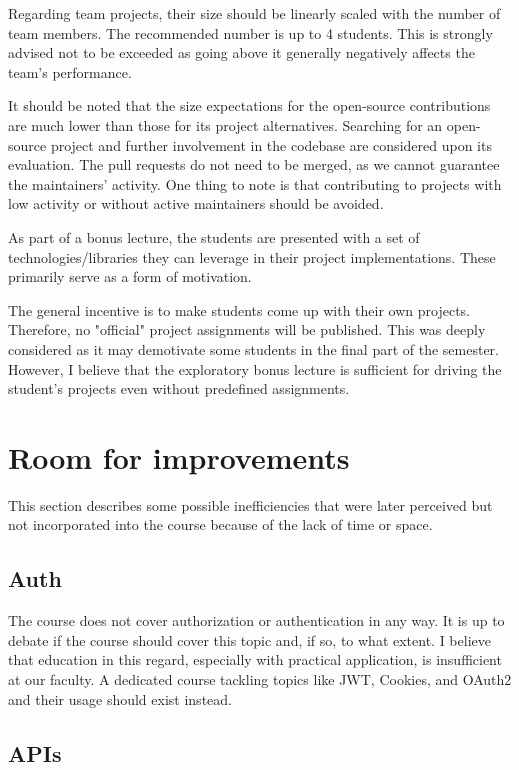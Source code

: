 \documentclass[
  digital,
  color,
  oneside,
  nosansbold,
  nocolorbold,
  lof,
  lot,
]{fithesis4}
\begin{document}
Regarding team projects, their size should be linearly scaled with the number of team members. The recommended number is up to 4 students. This is strongly advised not to be exceeded as going above it generally negatively affects the team's performance.

It should be noted that the size expectations for the open-source contributions are much lower than those for its project alternatives. Searching for an open-source project and further involvement in the codebase are considered upon its evaluation. The pull requests do not need to be merged, as we cannot guarantee the maintainers' activity. One thing to note is that contributing to projects with low activity or without active maintainers should be avoided.

As part of a bonus lecture, the students are presented with a set of technologies/libraries they can leverage in their project implementations. These primarily serve as a form of motivation.

The general incentive is to make students come up with their own projects. Therefore, no "official" project assignments will be published. This was deeply considered as it may demotivate some students in the final part of the semester. However, I believe that the exploratory bonus lecture is sufficient for driving the student's projects even without predefined assignments.

\section{Room for improvements}

This section describes some possible inefficiencies that were later perceived but not incorporated into the course because of the lack of time or space.

\subsection{Auth}

The course does not cover authorization or authentication in any way. It is up to debate if the course should cover this topic and, if so, to what extent. I believe that education in this regard, especially with practical application, is insufficient at our faculty. A dedicated course tackling topics like JWT, Cookies, and OAuth2 and their usage should exist instead.

\subsection{APIs}
\end{document}
